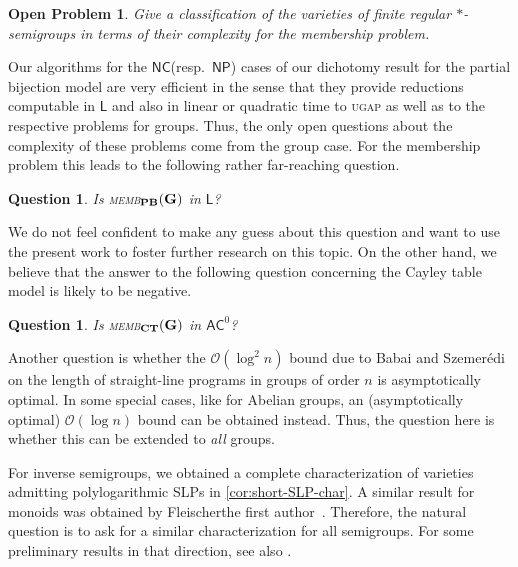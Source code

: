 \documentclass[anonymous,letter,UKenglish,cleveref,autoref,thm-restate]{lipics-v2021}
\newcommand{\bigO}{\mathcal{O}}
\newcommand{\ACz}{\ensuremath{\mathsf{AC}^0}\xspace}
\newcommand{\NC}{\ensuremath{\mathsf{NC}}\xspace}
\newcommand{\LOGSPACE}{\ensuremath{\mathsf{L}}\xspace}
\newcommand{\NP}{\ensuremath{\mathsf{NP}}\xspace}
\newcommand{\vG}{\ensuremath{\mathbf{G}}}
\theoremstyle{plain}
\newtheorem{question}[theorem]{Question}
\newtheorem{problem}[theorem]{Open Problem}
\theoremstyle{plain}
\newcommand{\dMemb}[2][]{\textup{\textsc{memb${}_{\mathbf{#1}}\expandafter\ifx\expandafter\relax\detokenize{#2}\relax\else(#2)\fi$}}}
\newcommand{\prob}[1]{\textup{\textsc{#1}}\xspace}
\newcommand{\dUGAP}{\prob{ugap}}
\begin{document}
\begin{problem}
	Give a classification of the varieties of finite regular $\ast$-semigroups in terms of their complexity for the membership problem.
\end{problem}


Our algorithms for the \NC (resp.\ \NP) cases of our dichotomy result for the partial bijection model are very efficient in the sense that they provide reductions computable in \LOGSPACE and also in linear or quadratic time to \dUGAP as well as to the respective problems for groups.
Thus, the only open questions about the complexity of these problems come from the group case.
For the membership problem this leads to the following rather far-reaching question.

\begin{question}
	Is \dMemb[PB]{\vG} in \LOGSPACE?
\end{question}

We do not feel confident to make any guess about this question and want to use the present work to foster further research on this topic.
On the other hand, we believe that the answer to the following question concerning the Cayley table model is likely to be negative.

\begin{question}
	Is \dMemb[CT]{\vG} in \ACz?
\end{question}

Another question is whether the $\bigO(\log^2 n)$ bound due to Babai and Szemer\'edi~\cite{BabaiS84} on the length of straight-line programs in groups of order $n$  is asymptotically optimal.
In some special cases, like for Abelian groups, an (asymptotically optimal) $\bigO (\log n)$ bound can be obtained instead.
Thus, the question here is whether this can be extended to \emph{all} groups.

For inverse semigroups, we obtained a complete characterization of varieties admitting polylogarithmic SLPs in \cref{cor:short-SLP-char}.
A similar result for monoids was obtained by \ifAnonimous Fleischer\else the first author\fi~\cite{Fleischer19diss}.
Therefore, the natural question is to ask for a similar characterization for all semigroups. 
For some preliminary results in that direction, see also \cite{Fleischer19diss}.




\end{document}
